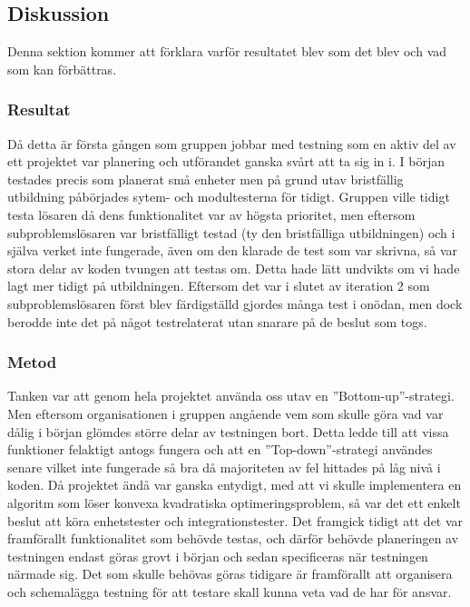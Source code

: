 	\subsection{Diskussion}
	Denna sektion kommer att förklara varför resultatet blev som det blev och vad som kan förbättras.	
	
	\subsubsection{Resultat}
	Då detta är första gången som gruppen jobbar med testning som en aktiv del av ett projektet var planering och utförandet ganska svårt att ta sig in i. I början testades precis som planerat små enheter men på grund utav bristfällig utbildning påbörjades sytem- och modultesterna för tidigt. Gruppen ville tidigt testa lösaren då dens funktionalitet var av högsta prioritet, men eftersom subproblemslösaren var bristfälligt testad (ty den bristfälliga utbildningen) och i själva verket inte fungerade, även om den klarade de test som var skrivna, så var stora delar av koden tvungen att testas om. Detta hade lätt undvikts om vi hade lagt mer tidigt på utbildningen. Eftersom det var i slutet av iteration 2 som subproblemslösaren först blev färdigställd gjordes många test i onödan, men dock berodde inte det på något testrelaterat utan snarare på de beslut som togs. 
	
	\subsubsection{Metod}
	Tanken var att genom hela projektet använda oss utav en ''Bottom-up''-strategi. Men eftersom organisationen i gruppen angående vem som skulle göra vad var dålig i början glömdes större delar av testningen bort. Detta ledde till att vissa funktioner felaktigt antogs fungera och att en ''Top-down''-strategi användes senare vilket inte fungerade så bra då majoriteten av fel hittades på låg nivå i koden.
	Då projektet ändå var ganska entydigt, med att vi skulle implementera en algoritm som löser konvexa kvadratiska optimeringsproblem, så var det ett enkelt beslut att köra enhetstester och integrationstester. Det framgick tidigt att det var framförallt funktionalitet som behövde testas, och därför behövde planeringen av testningen endast göras grovt i början och sedan specificeras när testningen närmade sig. Det som skulle behövas göras tidigare är framförallt att organisera och schemalägga testning för att testare skall kunna veta vad de har för ansvar. 
	
